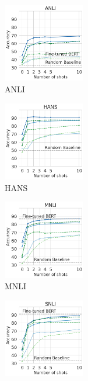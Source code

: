 \begin{figure}[t]
    \begin{subfigure}[b]{0.217\textwidth}
    \centering
    \includegraphics[height=3.45cm]{figures/anli}
    \caption{ANLI}
    \end{subfigure}
    \label{fig:anli}
    \begin{subfigure}[b]{0.19\textwidth}
    \centering
    \includegraphics[height=3.45cm, trim=25mm 0 0 0, clip]{figures/hansnli}
    \caption{HANS}
    \label{fig:hans}
    \end{subfigure}
    \begin{subfigure}[b]{0.19\textwidth}
    \centering
    \includegraphics[height=3.45cm, trim=25mm 0 0 0, clip]{figures/mnli_matched}
    \caption{MNLI}
    \label{fig:mnli}
    \end{subfigure}
    \begin{subfigure}[b]{0.19\textwidth}
    \centering
    \includegraphics[height=3.45cm, trim=25mm 0 0 0, clip]{figures/snli}

\end{subfigure}
\end{figure}
